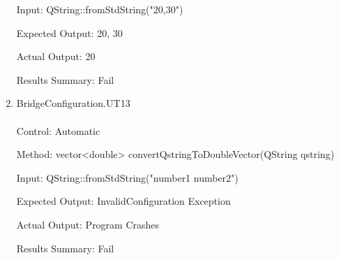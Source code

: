 \documentclass[12pt, titlepage]{article}
\begin{document}
\begin{enumerate}
    Input: QString::fromStdString("20,30")
    
    Expected Output: {20, 30}

    Actual Output: {20}

    Results Summary: Fail

    \item {BridgeConfiguration.UT13\\\\}
    Control: Automatic
    
    Method:  vector<double> convertQstringToDoubleVector(QString qstring)
    
    Input: QString::fromStdString("number1 number2")
    
    Expected Output: InvalidConfiguration Exception

    Actual Output: Program Crashes

    Results Summary: Fail
\end{enumerate}
\end{document}
